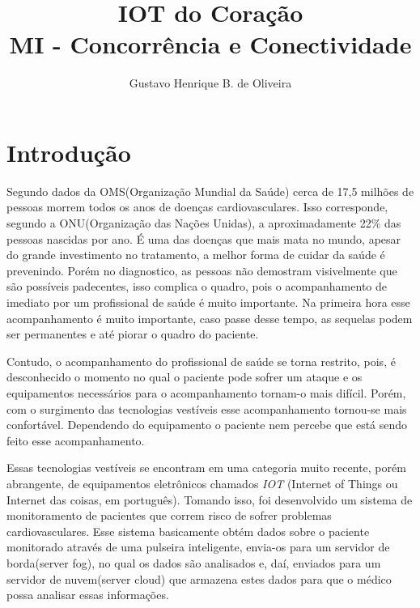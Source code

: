 \documentclass[12pt]{article}
\begin{document}
 



\title{IOT do Coração\\ MI - Concorrência e Conectividade}

\author{Gustavo Henrique B. de Oliveira}
  


\address{Departamento de Tecnologia -- Universidade Estadual de Feira de Santana
  (UEFS)\\
  Caixa Postal 252 e 294 -- 44.036-900 -- Feira de Santana -- BA -- Brasil}


\maketitle


\section{Introdução}

Segundo dados da OMS(Organização Mundial da Saúde) cerca de 17,5 milhões\cite{OMS} de pessoas morrem todos os anos de doenças cardiovasculares. Isso corresponde, segundo a ONU(Organização das Nações Unidas), a aproximadamente 22\% das pessoas nascidas por ano. É uma das doenças que mais mata no mundo, apesar do grande investimento no tratamento, a melhor forma de cuidar da saúde é prevenindo. Porém no diagnostico, as pessoas não demostram visivelmente que são possíveis padecentes, isso complica o quadro, pois o acompanhamento de imediato por um profissional de saúde é muito importante. Na primeira hora esse acompanhamento é muito importante, caso passe desse tempo, as sequelas podem ser permanentes e até piorar o quadro do paciente.

Contudo, o acompanhamento do profissional de saúde se torna restrito, pois, é desconhecido o momento no qual o paciente pode sofrer um ataque e os equipamentos necessários para o acompanhamento tornam-o mais difícil. Porém, com o surgimento das tecnologias vestíveis esse acompanhamento tornou-se mais confortável. Dependendo do equipamento o paciente nem percebe que está sendo feito esse acompanhamento.

Essas tecnologias vestíveis se encontram em uma categoria muito recente, porém abrangente, de equipamentos eletrônicos chamados \textit{IOT} (Internet of Things ou Internet das coisas, em português). Tomando isso, foi desenvolvido um sistema de monitoramento de pacientes que correm risco de sofrer problemas cardiovasculares. Esse sistema basicamente obtém dados sobre o paciente monitorado através de uma pulseira inteligente, envia-os para um servidor de borda(server fog), no qual os dados são analisados e, daí, enviados para um servidor de nuvem(server cloud) que armazena estes dados para que o médico possa analisar essas informações.
\end{document}
